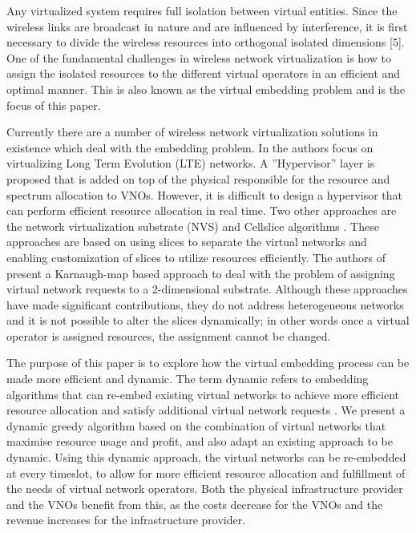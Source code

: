 \documentclass[conference]{IEEEtran}
\begin{document}
Any virtualized system requires full isolation between virtual entities. Since the wireless links are broadcast in nature and are influenced by interference, it is first necessary to divide the wireless resources into orthogonal isolated dimensions [5]. One of the fundamental challenges in wireless network virtualization is how to assign the isolated resources to the different virtual operators in an efficient and optimal manner. This is also known as the virtual embedding problem and is the focus of this paper.





Currently there are a number of wireless network virtualization solutions in existence which deal with the embedding problem. In \cite{Zaki2011} the authors focus on virtualizing Long Term Evolution (LTE) networks. A ”Hypervisor” layer is proposed that is added on top of the physical responsible for the resource and spectrum allocation to VNOs. However, it is difficult to design a hypervisor that can perform efficient resource allocation in real time. Two other approaches are the network virtualization substrate (NVS) \cite{Kokku2012} and Cellslice algorithms \cite{Kokku2013}. These approaches are based on using slices to separate the virtual networks and enabling customization of slices to utilize resources efficiently. The authors of \cite{Yang2012} present a Karnaugh-map based approach to deal with the problem of assigning virtual network requests to a 2-dimensional substrate.
Although these approaches have made significant contributions, they do not address heterogeneous networks and it is not possible to alter the slices dynamically; in other words once a virtual operator is assigned resources, the assignment cannot be changed.








The purpose of this paper is to explore how the virtual embedding process can be made more efficient and dynamic. The term dynamic refers to embedding algorithms that can re-embed existing virtual networks to achieve more efficient resource allocation and satisfy additional virtual network requests \cite{Fischer2013}. We present a dynamic greedy algorithm based on the combination of virtual networks that maximise resource usage and profit, and also adapt an existing approach to be dynamic. Using this dynamic approach, the virtual networks can be re-embedded at every timeslot, to allow for more efficient resource allocation and fulfillment of the needs of virtual network operators. Both the physical infrastructure provider and the VNOs benefit from this, as the costs decrease for the VNOs and the revenue increases for the infrastructure provider.
\end{document}
